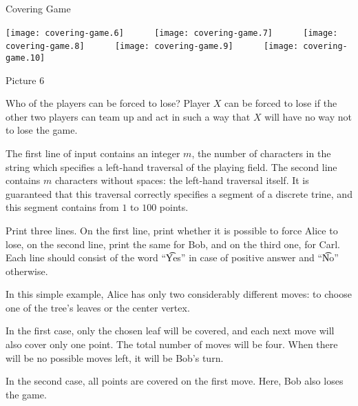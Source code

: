 \begin{problem}{Covering Game}
\begin{center}
\texttt{[image: covering-game.6]}
~~~~~
\texttt{[image: covering-game.7]}
~~~~~
\texttt{[image: covering-game.8]}
~~~~~
\texttt{[image: covering-game.9]}
~~~~~
\texttt{[image: covering-game.10]}

Picture 6
\end{center}

Who of the players can be forced to lose?
Player $X$ can be forced to lose if the other two players can team up
and act in such a way that $X$ will have no way not to lose the game.

\InputFile

The first line of input contains an integer $m$, the number of characters
in the string which specifies a left-hand traversal of the playing field.
The second line contains $m$ characters without spaces:
the left-hand traversal itself.
It is guaranteed that this traversal correctly specifies a segment
of a discrete trine, and this segment contains from $1$ to $100$ points.

\OutputFile

Print three lines.
On the first line, print whether it is possible to force Alice to lose,
on the second line, print the same for Bob, and on the third one, for Carl.
Each line should consist of the word ``\t{Yes}'' in case of positive answer
and ``\t{No}'' otherwise.

\Example

\begin{examplethree}
%
\end{examplethree}

\Explanation

In this simple example, Alice has only two considerably different moves:
to choose one of the tree's leaves or the center vertex.

In the first case, only the chosen leaf will be covered, and each next move
will also cover only one point.
The total number of moves will be four.
When there will be no possible moves left, it will be Bob's turn.

In the second case, all points are covered on the first move.
Here, Bob also loses the game.

\end{problem}
